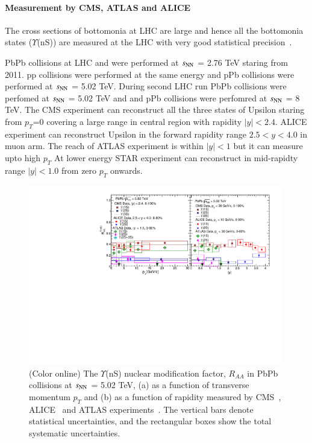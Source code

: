 \paragraph{Measurement by CMS, ATLAS and ALICE}
 The cross sections of bottomonia at LHC are large and hence all the 
bottomonia states ($\Upsilon$(nS)) are measured at the LHC with very good statistical
precision~\cite{Chatrchyan:2012lxa,Abelev:2014nua,Chatrchyan:2011pe,Khachatryan:2016xxp}.

PbPb collisions at LHC and were performed at $s_{\rm NN}$ = 2.76 TeV staring from 
2011. pp collisions were performed at the same energy and pPb collisions were performed
at $s_{\rm NN}$ = 5.02 TeV. 
During second LHC run PbPb collisions were perfomed at $s_{\rm NN}$ = 5.02 TeV and
and pPb collisions were perfomred at $s_{\rm NN}$ = 8 TeV. 
The CMS experiment can reconstruct all the three states of Upsilon staring from
$p_T$=0 covering a large range in central region with rapidity $|y| < 2.4$.
ALICE experiment can reconstruct Upsilon in the forward rapidity range
$2.5 < y < 4.0$ in muon arm.
The reach of ATLAS experiment is within $|y| < 1$ but it can measure upto high $p_T$
At lower energy STAR experiment can reconstruct in mid-rapidty range
$|y| < 1.0$ from zero $p_T$ onwards. 

\begin{figure}
  \includegraphics[width=0.99\textwidth]{Figures/ExpOverview/Fig_LHC_YnSRAAPtRap.pdf}
  \caption{(Color online) The $\Upsilon$(nS) nuclear modification factor, $R_{AA}$
in PbPb collisions at $s_{\rm NN}$ = 5.02 TeV, (a) as a function of transverse momentum $p_{T}$
    and (b) as a function of rapidity measured by CMS~\cite{CMS:2018zza}, ALICE~\cite{ALICE:2020wwx}
    and ATLAS experiments~\cite{ALICE:2020wwx}.
    The vertical bars denote statistical uncertainties, and the rectangular boxes
    show the total systematic uncertainties.
  }
  \label{fig:LHCYnSRAAPtRap}
\end{figure}


